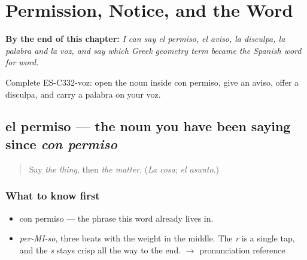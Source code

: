 
\chapter{Permission, Notice, and the Word}
\label{ch:permiso-y-voz}

\begin{chapteropening}
\textbf{By the end of this chapter:} \emph{I can say el permiso, el aviso, la disculpa, la palabra and la voz, and say which Greek geometry term became the Spanish word for word.}

Complete ES-C332-voz: open the noun inside con permiso, give an aviso, offer a disculpa, and carry a palabra on your voz.
\end{chapteropening}

\section[el permiso]{el permiso — the noun you have been saying since \emph{con permiso}}

\label{lesson:ES-C332-permiso}



\begin{quote}
Say \emph{the thing}, then \emph{the matter}. (\emph{La cosa}; \emph{el asunto}.)
\end{quote}

\subsection*{What to know first}
\begin{itemize}
\raggedright
  \item con permiso — the phrase this word already lives in.
\end{itemize}

\begin{sounds}
\begin{itemize}
\raggedright
  \item \emph{per-MI-so}, three beats with the weight in the middle. The \emph{r} is a single tap, and the \emph{s} stays crisp all the way to the end. $\to$ pronunciation reference
\end{itemize}
\end{sounds}

